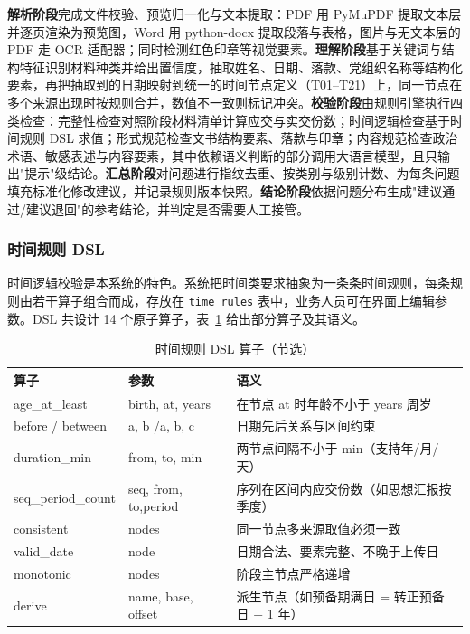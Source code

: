 \documentclass[12pt,a4paper]{ctexart}
\begin{document}
\textbf{解析阶段}完成文件校验、预览归一化与文本提取：PDF 用 PyMuPDF 提取文本层并逐页渲染为预览图，Word 用 python-docx 提取段落与表格，图片与无文本层的 PDF 走 OCR 适配器；同时检测红色印章等视觉要素。\textbf{理解阶段}基于关键词与结构特征识别材料种类并给出置信度，抽取姓名、日期、落款、党组织名称等结构化要素，再把抽取到的日期映射到统一的时间节点定义（T01--T21）上，同一节点在多个来源出现时按规则合并，数值不一致则标记冲突。\textbf{校验阶段}由规则引擎执行四类检查：完整性检查对照阶段材料清单计算应交与实交份数；时间逻辑检查基于时间规则 DSL 求值；形式规范检查文书结构要素、落款与印章；内容规范检查政治术语、敏感表述与内容要素，其中依赖语义判断的部分调用大语言模型，且只输出"提示"级结论。\textbf{汇总阶段}对问题进行指纹去重、按类别与级别计数、为每条问题填充标准化修改建议，并记录规则版本快照。\textbf{结论阶段}依据问题分布生成"建议通过/建议退回"的参考结论，并判定是否需要人工接管。

\subsubsection{时间规则 DSL}

时间逻辑校验是本系统的特色。系统把时间类要求抽象为一条条时间规则，每条规则由若干算子组合而成，存放在 \texttt{time\_rules} 表中，业务人员可在界面上编辑参数。DSL 共设计 14 个原子算子，表~\ref{tab:dsl} 给出部分算子及其语义。

\begin{table}[H]
  \centering
  \caption{时间规则 DSL 算子（节选）}
  \label{tab:dsl}
  \small
  \begin{tabular}{p{3.0cm}p{5.0cm}p{6.0cm}}
    \toprule
    \textbf{算子} & \textbf{参数} & \textbf{语义} \\
    \midrule
    age\_\allowbreak at\_\allowbreak least & birth, at, years & 在节点 at 时年龄不小于 years 周岁 \\
    before / between & a, b /\allowbreak a, b, c & 日期先后关系与区间约束 \\
    duration\_\allowbreak min & from, to, min & 两节点间隔不小于 min（支持年/月/天） \\
    seq\_\allowbreak period\_\allowbreak count & seq, from, to,\allowbreak period & 序列在区间内应交份数（如思想汇报按季度） \\
    consistent & nodes & 同一节点多来源取值必须一致 \\
    valid\_\allowbreak date & node & 日期合法、要素完整、不晚于上传日 \\
    monotonic & nodes & 阶段主节点严格递增 \\
    derive & name, base, offset & 派生节点（如预备期满日 = 转正预备日 + 1 年） \\
    \bottomrule
  \end{tabular}
\end{table}
\end{document}
